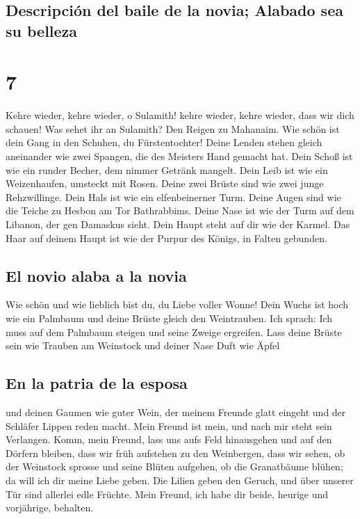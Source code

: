 \hypertarget{descripciuxf3n-del-baile-de-la-novia-alabado-sea-su-belleza}{%
\subsection{Descripción del baile de la novia; Alabado sea su
belleza}\label{descripciuxf3n-del-baile-de-la-novia-alabado-sea-su-belleza}}

\hypertarget{section-6}{%
\section{7}\label{section-6}}

 Kehre wieder, kehre wieder, o Sulamith! kehre wieder,
kehre wieder, dass wir dich schauen! Was sehet ihr an Sulamith? Den
Reigen zu Mahanaim.  Wie schön ist dein Gang in den
Schuhen, du Fürstentochter! Deine Lenden stehen gleich aneinander wie
zwei Spangen, die des Meisters Hand gemacht hat.  Dein
Schoß ist wie ein runder Becher, dem nimmer Getränk mangelt. Dein Leib
ist wie ein Weizenhaufen, umsteckt mit Rosen.  Deine zwei
Brüste sind wie zwei junge Rehzwillinge.  Dein Hals ist
wie ein elfenbeinerner Turm. Deine Augen sind wie die Teiche zu Hesbon
am Tor Bathrabbims. Deine Nase ist wie der Turm auf dem Libanon, der gen
Damaskus sieht.  Dein Haupt steht auf dir wie der Karmel.
Das Haar auf deinem Haupt ist wie der Purpur des Königs, in Falten
gebunden.

\hypertarget{el-novio-alaba-a-la-novia}{%
\subsection{El novio alaba a la novia}\label{el-novio-alaba-a-la-novia}}

 Wie schön und wie lieblich bist du, du Liebe voller
Wonne!  Dein Wuchs ist hoch wie ein Palmbaum und deine
Brüste gleich den Weintrauben.  Ich sprach: Ich muss auf
dem Palmbaum steigen und seine Zweige ergreifen. Lass deine Brüste sein
wie Trauben am Weinstock und deiner Nase Duft wie Äpfel

\hypertarget{en-la-patria-de-la-esposa}{%
\subsection{En la patria de la esposa}\label{en-la-patria-de-la-esposa}}

 und deinen Gaumen wie guter Wein, der meinem Freunde
glatt eingeht und der Schläfer Lippen reden macht.  Mein
Freund ist mein, und nach mir steht sein Verlangen. 
Komm, mein Freund, lass uns aufs Feld hinausgehen und auf den Dörfern
bleiben,  dass wir früh aufstehen zu den Weinbergen, dass
wir sehen, ob der Weinstock sprosse und seine Blüten aufgehen, ob die
Granatbäume blühen; da will ich dir meine Liebe geben. 
Die Lilien geben den Geruch, und über unserer Tür sind allerlei edle
Früchte. Mein Freund, ich habe dir beide, heurige und vorjährige,
behalten.


